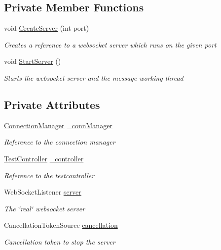 \subsection*{Private Member Functions}
\begin{DoxyCompactItemize}
\item 
void \hyperlink{class_web_analyzer_1_1_server_1_1_websocket_server_a6bd50680516243f710b7eb189241b256}{Create\+Server} (int port)
\begin{DoxyCompactList}\small\item\em Creates a reference to a websocket server which runs on the given port \end{DoxyCompactList}\item 
void \hyperlink{class_web_analyzer_1_1_server_1_1_websocket_server_a8fffc04eae205c57504ee4307313bca8}{Start\+Server} ()
\begin{DoxyCompactList}\small\item\em Starts the websocket server and the message working thread \end{DoxyCompactList}\end{DoxyCompactItemize}
\subsection*{Private Attributes}
\begin{DoxyCompactItemize}
\item 
\hyperlink{class_web_analyzer_1_1_server_1_1_connection_manager}{Connection\+Manager} \hyperlink{class_web_analyzer_1_1_server_1_1_websocket_server_ac98422e37a10a6c4fd3900a09b003b5e}{\+\_\+conn\+Manager}
\begin{DoxyCompactList}\small\item\em Reference to the connection manager \end{DoxyCompactList}\item 
\hyperlink{class_web_analyzer_1_1_controller_1_1_test_controller}{Test\+Controller} \hyperlink{class_web_analyzer_1_1_server_1_1_websocket_server_ae9083f25b4a1b713998b19eb68e35d6e}{\+\_\+controller}
\begin{DoxyCompactList}\small\item\em Reference to the testcontroller \end{DoxyCompactList}\item 
Web\+Socket\+Listener \hyperlink{class_web_analyzer_1_1_server_1_1_websocket_server_abc42c992699d787cfdcb33f9e51140b4}{server}
\begin{DoxyCompactList}\small\item\em The \char`\"{}real\char`\"{} websocket server \end{DoxyCompactList}\item 
Cancellation\+Token\+Source \hyperlink{class_web_analyzer_1_1_server_1_1_websocket_server_ac6ff75e9f3bc2200953d755b029e5344}{cancellation}
\begin{DoxyCompactList}\small\item\em Cancellation token to stop the server \end{DoxyCompactList}\end{DoxyCompactItemize}


